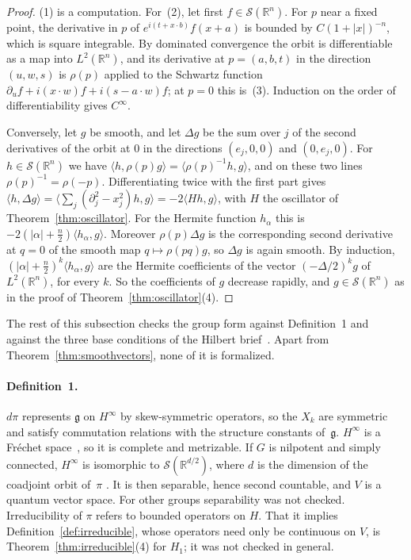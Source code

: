 \documentclass[11pt]{article}
\theoremstyle{definition}
\begin{document}
\begin{proof}
  (1) is a computation. For~(2), let first $f \in \mathcal S(\mathbb R^n)$. For $p$ near a
  fixed point, the derivative in $p$ of $e^{i(t + x \cdot b)} f(x + a)$ is bounded by
  $C(1 + |x|)^{-n}$, which is square integrable. By dominated convergence the orbit is
  differentiable as a map into $L^2(\mathbb R^n)$, and its derivative at $p = (a, b, t)$ in the
  direction $(u, w, s)$ is $\rho(p)$ applied to the Schwartz function
  $\partial_u f + i (x \cdot w) f + i (s - a \cdot w) f$; at $p = 0$ this is~(3). Induction on
  the order of differentiability gives $C^\infty$.

  Conversely, let $g$ be smooth, and let $\Delta g$ be the sum over $j$ of the second derivatives
  of the orbit at $0$ in the directions $(e_j, 0, 0)$ and $(0, e_j, 0)$. For
  $h \in \mathcal S(\mathbb R^n)$ we have $\langle h, \rho(p) g\rangle = \langle \rho(p)^{-1} h,
  g\rangle$, and on these two lines $\rho(p)^{-1} = \rho(-p)$. Differentiating twice with the first
  part gives $\langle h, \Delta g\rangle = \langle \sum_j (\partial_j^2 - x_j^2) h, g\rangle =
  -2 \langle H h, g\rangle$, with $H$ the oscillator of Theorem~\ref{thm:oscillator}. For the
  Hermite function $h_\alpha$ this is $-2(|\alpha| + \frac n2)\langle h_\alpha, g\rangle$. Moreover
  $\rho(p) \Delta g$ is the corresponding second derivative at $q = 0$ of the smooth map
  $q \mapsto \rho(pq) g$, so $\Delta g$ is again smooth. By induction,
  $(|\alpha| + \frac n2)^k \langle h_\alpha, g\rangle$ are the Hermite coefficients of the vector
  $(-\Delta/2)^k g$ of $L^2(\mathbb R^n)$, for every $k$. So the coefficients of $g$ decrease
  rapidly, and $g \in \mathcal S(\mathbb R^n)$ as in the proof of
  Theorem~\ref{thm:oscillator}(4).
\end{proof}

The rest of this subsection checks the group form against Definition~1 and against the three base
conditions of the Hilbert brief~\cite{hilbert}. Apart from Theorem~\ref{thm:smoothvectors}, none
of it is formalized.

\paragraph{Definition~1.} $d\pi$ represents $\mathfrak g$ on $H^\infty$ by skew-symmetric
operators, so the $X_k$ are symmetric and satisfy commutation relations with the structure
constants of~$\mathfrak g$. $H^\infty$ is a Fr\'echet space~\cite[Cor.~1.1]{goodman}, so it is
complete and metrizable. If $G$ is nilpotent and simply connected, $H^\infty$ is isomorphic to
$\mathcal S(\mathbb R^{d/2})$, where $d$ is the dimension of the coadjoint orbit of~$\pi$
\cite[proof of Cor.~3.14]{bb}. It is then separable, hence second countable, and $V$ is a quantum
vector space. For other groups separability was not checked. Irreducibility of $\pi$ refers to
bounded operators on $H$. That it implies Definition~\ref{def:irreducible}, whose operators need
only be continuous on $V$, is Theorem~\ref{thm:irreducible}(4) for $H_1$; it was not checked in
general.
\end{document}
